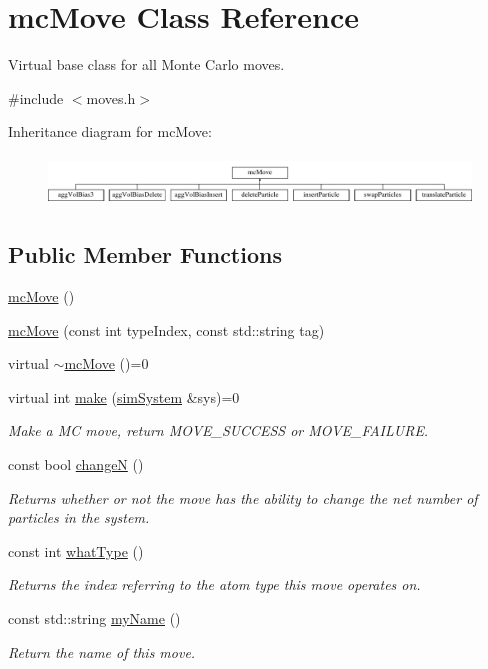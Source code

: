 \hypertarget{classmc_move}{\section{mc\-Move Class Reference}
\label{classmc_move}
}


Virtual base class for all Monte Carlo moves.  




{\ttfamily \#include $<$moves.\-h$>$}

Inheritance diagram for mc\-Move\-:\begin{figure}[H]
\begin{center}
\leavevmode
\includegraphics[height=1.333333cm]{classmc_move}
\end{center}
\end{figure}
\subsection*{Public Member Functions}
\begin{DoxyCompactItemize}
\item 
\hyperlink{classmc_move_a27a375cf5fcce904dc1ba6bc315b4e1c}{mc\-Move} ()
\item 
\hyperlink{classmc_move_ab0145ba0532e4d47156e2e4565d54c3f}{mc\-Move} (const int type\-Index, const std\-::string tag)
\item 
virtual \hyperlink{classmc_move_a3d9fd30dd96eebf857fa92f734d03bbc}{$\sim$mc\-Move} ()=0
\item 
virtual int \hyperlink{classmc_move_a2e377a628f9ecee5422fc8967d4924eb}{make} (\hyperlink{classsim_system}{sim\-System} \&sys)=0
\begin{DoxyCompactList}\small\item\em Make a M\-C move, return M\-O\-V\-E\-\_\-\-S\-U\-C\-C\-E\-S\-S or M\-O\-V\-E\-\_\-\-F\-A\-I\-L\-U\-R\-E. \end{DoxyCompactList}\item 
const bool \hyperlink{classmc_move_af7c25017175b8ac61366331c80820758}{change\-N} ()
\begin{DoxyCompactList}\small\item\em Returns whether or not the move has the ability to change the net number of particles in the system. \end{DoxyCompactList}\item 
const int \hyperlink{classmc_move_aa96ed066866a2abf8b7039fd279d0f37}{what\-Type} ()
\begin{DoxyCompactList}\small\item\em Returns the index referring to the atom type this move operates on. \end{DoxyCompactList}\item 
const std\-::string \hyperlink{classmc_move_a7b068357010f8663674a7e70a7776ccd}{my\-Name} ()
\begin{DoxyCompactList}\small\item\em Return the name of this move. \end{DoxyCompactList}\end{DoxyCompactItemize}
